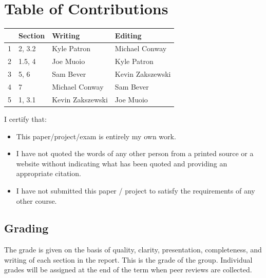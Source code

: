 \documentclass{article}
\begin{document}
\section*{\centering Table of Contributions}
\begin{tabular}{| l | l | l | l |}
    \hline
     & Section & Writing & Editing \\
    \hline \hline
		1 & 2, 3.2 & Kyle Patron & Michael Conway \\ \hline
		2 & 1.5, 4 & Joe Muoio & Kyle Patron \\ \hline
		3 & 5, 6 & Sam Bever &  Kevin Zakszewski \\ \hline
		4 & 7 & Michael Conway &  Sam Bever \\ \hline
		5 & 1, 3.1 & Kevin Zakszewski &  Joe Muoio \\ \hline
\end{tabular}
\newpage
\noindent I certify that:
\begin{itemize}
\item This paper/project/exam is entirely my own work.
\item I have not quoted the words of any other person from a printed source or a website without indicating what has been quoted and providing an appropriate citation.
\item I have not submitted this paper / project to satisfy the requirements of any other course.
\end{itemize}

\vspace{1cm}
\noindent{}


\vspace{0.5cm}
\noindent{}

\vspace{0.5cm}
\noindent{}

\vspace{0.5cm}
\noindent{}

\vspace{0.5cm}
\noindent{}

\vspace{\fill}
\subsection*{Grading}
The grade is given on the basis of quality, clarity, presentation, completeness, and writing of each section in the report. This is the grade of the group. Individual grades will be assigned at the end of the term when peer reviews are collected.
\end{document}
